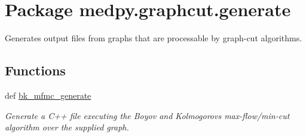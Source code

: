 \hypertarget{namespacemedpy_1_1graphcut_1_1generate}{
\section{Package medpy.graphcut.generate}
\label{namespacemedpy_1_1graphcut_1_1generate}
}


Generates output files from graphs that are processable by graph-\/cut algorithms.  


\subsection*{Functions}
\begin{DoxyCompactItemize}
\item 
def \hyperlink{namespacemedpy_1_1graphcut_1_1generate_a3c9ab1aed31733093c0b0bbc6c903ea1}{bk\_\-mfmc\_\-generate}
\begin{DoxyCompactList}\small\item\em Generate a C++ file executing the Boyov and Kolmogorovs max-\/flow/min-\/cut algorithm over the supplied graph. \end{DoxyCompactList}\end{DoxyCompactItemize}
